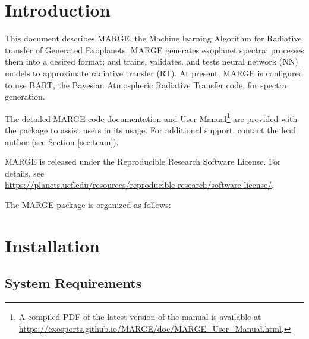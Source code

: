 \documentclass[letterpaper, 12pt]{article}
\begin{document}
\section{Introduction}
\label{sec:theory}

\noindent This document describes MARGE, the Machine learning Algorithm for Radiative 
transfer of Generated Exoplanets.  MARGE generates exoplanet spectra; processes 
them into a desired format; and trains, validates, and tests neural network (NN)
models to approximate radiative transfer (RT).  At present, MARGE is configured 
to use BART, the Bayesian Atmospheric Radiative Transfer code, for spectra 
generation.

The detailed MARGE code documentation and User Manual\footnote{A compiled PDF 
of the latest version of the manual is available at 
\href{https://exosports.github.io/MARGE/doc/MARGE_User_Manual.html}{https://exosports.github.io/MARGE/doc/MARGE_User_Manual.html}.} 
are provided with the package to assist users in its usage. 
For additional support, contact the lead author (see Section \ref{sec:team}).

MARGE is released under the Reproducible Research Software License.  
For details, see \\
\href{https://planets.ucf.edu/resources/reproducible-research/software-license/}{https://planets.ucf.edu/resources/reproducible-research/software-license/}.
\newline

\noindent The MARGE package is organized as follows: \newline
\noindent{}
\vspace{0.7cm}

\section{Installation}
\label{sec:installation}

\subsection{System Requirements}
\label{sec:requirements}
\end{document}
